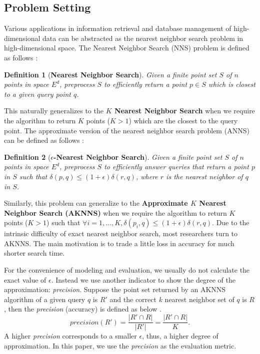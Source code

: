 \documentclass{vldb}
\newtheorem{definition}{Definition}
\begin{document}
\subsection{Problem Setting}
Various applications in information retrieval and database management of high-dimensional data can be abstracted as the nearest neighbor search problem in high-dimensional space.  The Nearest Neighbor Search (NNS) problem is defined as follows \cite{Gionis1999Similarity}:
\begin{definition}[\textbf{Nearest Neighbor Search}]
Given a finite point set $S$ of $n$ points in space $E^d$, preprocess $S$ to efficiently return a point $p \in S$ which is closest to a given query point $q$.
\end{definition}
This naturally generalizes to the \textbf{$K$ Nearest Neighbor Search} when we require the algorithm to return $K$ points ($K>1$) which are the closest to the query point. The approximate version of the nearest neighbor search problem (ANNS) can be defined as follows \cite{Gionis1999Similarity}:
\begin{definition}[\textbf{$\epsilon$-Nearest Neighbor Search}]
Given a finite point set $S$ of $n$ points in space $E^d$, preprocess $S$ to efficiently answer queries that return a point $p$ in $S$ such that $\delta(p,q) \le (1+\epsilon)\delta(r,q)$, where $r$ is the nearest neighbor of $q$ in $S$. 
\end{definition}
Similarly, this problem can generalize to the \textbf{Approximate $K$ Nearest Neighbor Search (AKNNS)} when we require the algorithm to return $K$ points ($K>1$) such that $\forall{i = 1,...,K},\delta(p_i,q) \le (1+\epsilon)\delta(r,q)$. Due to the intrinsic difficulty of exact nearest neighbor search, most researchers turn to AKNNS. The main motivation is to trade a little loss in accuracy for much shorter search time. 

For the convenience of modeling and evaluation, we usually do not calculate the exact value of $\epsilon$. Instead we use another indicator to show the degree of the approximation: \textit{precision}. Suppose the point set returned by an AKNNS algorithm of a given query $q$ is $R'$ and the correct $k$ nearest neighbor set of $q$ is $R$, then the \textit{precision} (accuracy) is defined as below \cite{CongEfanna2016}. 
\begin{equation}
precision(R') = \frac{|R' \cap R|}{|R'|} = \frac{|R' \cap R|}{K}.
\end{equation}
A higher \textit{precision} corresponds to a smaller $\epsilon$, thus, a higher degree of approximation. In this paper, we use the \textit{precision} as the evaluation metric.
\end{document}
